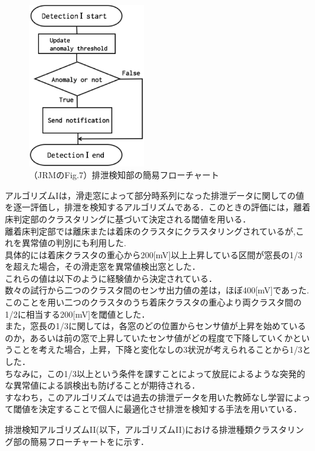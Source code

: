 \begin{figure}[t]
\centering
\includegraphics[width=5cm]{./fig/detection1.eps}
\caption{（JRMのFig.7）排泄検知部の簡易フローチャート}
\label{cluster1}
\end{figure}

アルゴリズムIは，滑走窓によって部分時系列になった排泄データに関しての値を逐一評価し，排泄を検知するアルゴリズムである．このときの評価には，離着床判定部のクラスタリングに基づいて決定される閾値を用いる．\\
離着床判定部では離床または着床のクラスタにクラスタリングされているが,これを異常値の判別にも利用した.\\
具体的には着床クラスタの重心から200[mV]以上上昇している区間が窓長の1/3を超えた場合，その滑走窓を異常値検出窓とした．\\
これらの値は以下のように経験値から決定されている．\\
数々の試行から二つのクラスタ間のセンサ出力値の差は，ほぼ400[mV]であった.\\
このことを用い二つのクラスタのうち着床クラスタの重心より両クラスタ間の1/2に相当する200[mV]を閾値とした．\\
また，窓長の1/3に関しては，各窓のどの位置からセンサ値が上昇を始めているのか，あるいは前の窓で上昇していたセンサ値がどの程度で下降していくかということを考えた場合，上昇，下降と変化なしの3状況が考えられることから1/3とした．\\
ちなみに，この1/3以上という条件を課すことによって放屁によるような突発的な異常値による誤検出も防げることが期待される．\\
すなわち，このアルゴリズムでは過去の排泄データを用いた教師なし学習によって閾値を決定することで個人に最適化させ排泄を検知する手法を用いている．

排泄検知アルゴリズムI\hspace{-.1em}I(以下，アルゴリズムI\hspace{-.1em}I)における排泄種類クラスタリング部の簡易フローチャートをに示す．

